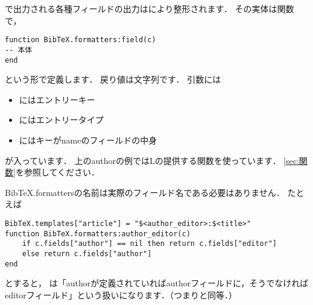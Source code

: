 \documentclass[a4paper]{ltjsarticle}
\DeclareRobustCommand{\LBibTeX}{L\BibTeX}
\begin{document}
で出力される各種フィールドの出力はにより整形されます．%
その実体は関数で，
\begin{lstlisting}
function BibTeX.formatters:field(c)
-- 本体
end
\end{lstlisting}
という形で定義します．
戻り値は文字列です．
引数には
\begin{itemize}
\item {}にはエントリーキー
\item {}にはエントリータイプ
\item {}にはキーがnameのフィールドの中身
\end{itemize}
が入っています．
上のauthorの例では\LBibTeX の提供する関数を使っています．
\ref{sec:関数}を参照してください．

BibTeX.formattersの名前は実際のフィールド名である必要はありません．
たとえば
\begin{lstlisting}
BibTeX.templates["article"] = "$<author_editor>:$<title>"
function BibTeX.formatters:author_editor(c)
    if c.fields["author"] == nil then return c.fields["editor"]
    else return c.fields["author"]
end
\end{lstlisting}
とすると，%
は「authorが定義されていればauthorフィールドに，そうでなければeditorフィールド」という扱いになります．（つまりと同等．）%
\end{document}
